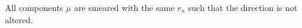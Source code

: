 \documentclass[twoside,english]{uiofysmaster}
\begin{document}
 All components $\mu$ are smeared with the same $r_n$ such that the direction is not altered. 


\end{document}
